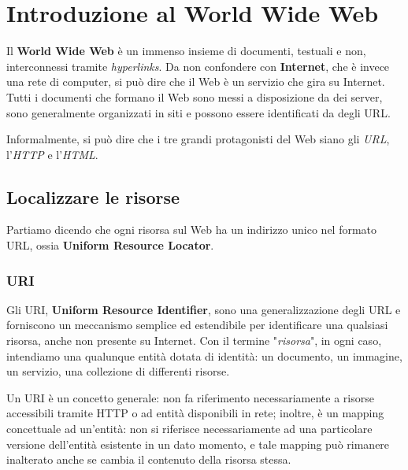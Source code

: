 \section{Introduzione al World Wide Web}
    Il \textbf{World Wide Web} è un immenso insieme di documenti, testuali e non, interconnessi tramite \textit{hyperlinks}. Da non confondere con \textbf{Internet}, che è invece una rete di computer, si può dire che il Web è un servizio che gira su Internet. Tutti i documenti che formano il Web sono messi a disposizione da dei server, sono generalmente organizzati in siti e possono essere identificati da degli URL.
    
    \vspace{3mm}
    
    Informalmente, si può dire che i tre grandi protagonisti del Web siano gli \textit{URL}, l'\textit{HTTP} e l'\textit{HTML}.
    
    \subsection{Localizzare le risorse}
    
        Partiamo dicendo che ogni risorsa sul Web ha un indirizzo unico nel formato URL, ossia \textbf{Uniform Resource Locator}.
    
        \subsubsection{URI}
        
            Gli URI, \textbf{Uniform Resource Identifier}, sono una generalizzazione degli URL e forniscono un meccanismo semplice ed estendibile per identificare una qualsiasi risorsa, anche non presente su Internet. Con il termine "\textit{risorsa}", in ogni caso, intendiamo una qualunque entità dotata di identità: un documento, un immagine, un servizio, una collezione di differenti risorse.
            
            \vspace{3mm}
            
            Un URI è un concetto generale: non fa riferimento necessariamente a risorse accessibili tramite HTTP o ad entità disponibili in rete; inoltre, è un mapping concettuale ad un'entità: non si riferisce necessariamente ad una particolare versione dell'entità esistente in un dato momento, e tale mapping può rimanere inalterato anche se cambia il contenuto della risorsa stessa. 
            
